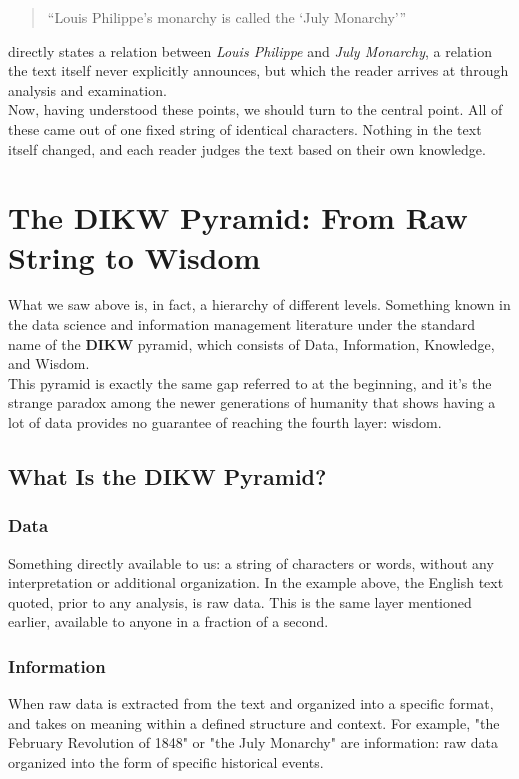 \begin{quote}
``Louis Philippe's monarchy is called the `July Monarchy'''
\end{quote}
directly states a relation between \textit{Louis Philippe} and \textit{July Monarchy}, a relation the text itself never explicitly announces, but which the reader arrives at through analysis and examination.\\
Now, having understood these points, we should turn to the central point. All of these came out of one fixed string of identical characters. Nothing in the text itself changed, and each reader judges the text based on their own knowledge.\\
\section{The DIKW Pyramid: From Raw String to Wisdom}
\label{sec:levels-of-data}

What we saw above is, in fact, a hierarchy of different levels. Something known in the data science and information management literature under the standard name of the \textbf{DIKW} pyramid, which consists of Data, Information, Knowledge, and Wisdom\autocite{ackoff1989,ratzan2004,walliman2011,unesco2008}.\\
This pyramid is exactly the same gap referred to at the beginning, and it's the strange paradox among the newer generations of humanity that shows having a lot of data provides no guarantee of reaching the fourth layer: wisdom.

\subsection{What Is the DIKW Pyramid?}
\label{sub:what-is-dikw}

\subsubsection{Data}
Something directly available to us: a string of characters or words, without any interpretation or additional organization. In the example above, the English text quoted, prior to any analysis, is raw data. This is the same layer mentioned earlier, available to anyone in a fraction of a second.

\subsubsection{Information}
When raw data is extracted from the text and organized into a specific format, and takes on meaning within a defined structure and context. For example, "the February Revolution of 1848" or "the July Monarchy" are information: raw data organized into the form of specific historical events.

